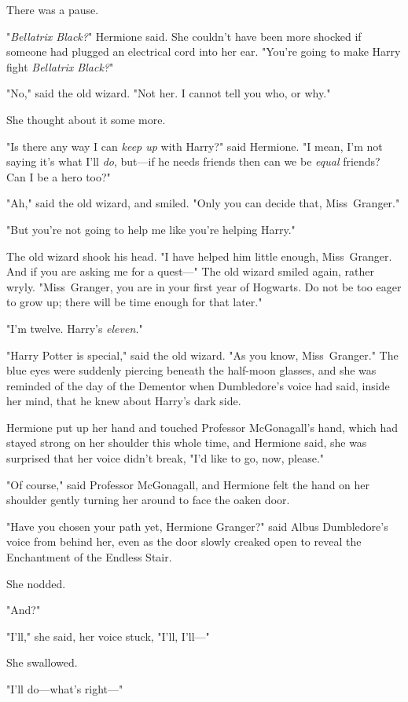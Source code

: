 There was a pause.

"\emph{Bellatrix Black?}" Hermione said. She couldn't have been more shocked if
someone had plugged an electrical cord into her ear. "You're going to make
Harry fight \emph{Bellatrix Black?}"

"No," said the old wizard. "Not her. I cannot tell you who, or why."

She thought about it some more.

"Is there any way I can \emph{keep up} with Harry?" said Hermione. "I mean, I'm
not saying it's what I'll \emph{do}, but---if he needs friends then can we be
\emph{equal} friends? Can I be a hero too?"

"Ah," said the old wizard, and smiled. "Only you can decide that, Miss~Granger."

"But you're not going to help me like you're helping Harry."

The old wizard shook his head. "I have helped him little enough, Miss~Granger.
And if you are asking me for a quest---" The old wizard smiled again, rather
wryly. "Miss~Granger, you are in your first year of Hogwarts. Do not be too
eager to grow up; there will be time enough for that later."

"I'm twelve. Harry's \emph{eleven.}"

"Harry Potter is special," said the old wizard. "As you know, Miss~Granger."
The blue eyes were suddenly piercing beneath the half-moon glasses, and she was
reminded of the day of the Dementor when Dumbledore's voice had said, inside
her mind, that he knew about Harry's dark side.

Hermione put up her hand and touched Professor McGonagall's hand, which had
stayed strong on her shoulder this whole time, and Hermione said, she was
surprised that her voice didn't break, "I'd like to go, now, please."

"Of course," said Professor McGonagall, and Hermione felt the hand on her
shoulder gently turning her around to face the oaken door.

"Have you chosen your path yet, Hermione Granger?" said Albus Dumbledore's
voice from behind her, even as the door slowly creaked open to reveal the
Enchantment of the Endless Stair.

She nodded.

"And?"

"I'll," she said, her voice stuck, "I'll, I'll---"

She swallowed.

"I'll do---what's right---"

